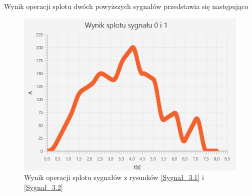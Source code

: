 \documentclass[12pt]{article}
\begin{document}
Wynik operacji splotu dwóch powyższych sygnałów przedstawia się następująco
\begin{figure}[H]
    \centering
	\includegraphics[width=\linewidth]{splot_3.1.png}
    \caption{Wynik operacji splotu sygnałów z rysunków \ref{Sygnał_3.1} i \ref{Sygnał_3.2}}
    \label{Wynik_3.1}
\end{figure}


\end{document}
